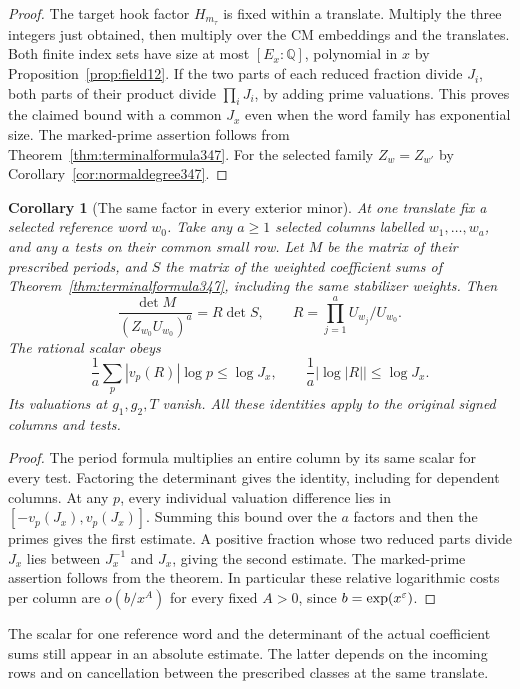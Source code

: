 \documentclass[a4paper,11pt]{article}
\newtheorem{corollary}[proposition]{Corollary}
\theoremstyle{definition}
\theoremstyle{remark}
\numberwithin{equation}{section}
\begin{document}
\begin{proof}
The target hook factor \(H_{m_\tau}\) is fixed within a
translate. Multiply the three integers just obtained, then
multiply over the CM embeddings and the translates. Both finite
index sets have size at most \([E_x:\mathbb Q]\), polynomial
in \(x\) by Proposition~\ref{prop:field12}. If the two parts
of each reduced fraction divide \(J_i\), both parts of their
product divide \(\prod_iJ_i\), by adding prime valuations.
This proves the claimed bound with a common \(J_x\) even when
the word family has exponential size. The marked-prime
assertion follows from Theorem~\ref{thm:terminalformula347}.
For the selected family \(Z_w=Z_{w'}\) by
Corollary~\ref{cor:normaldegree347}.
\end{proof}

\begin{corollary}[The same factor in every exterior minor]\leavevmode
\label{cor:wordplaces348}
At one translate fix a selected reference word \(w_0\). Take
any \(a\ge1\) selected columns labelled \(w_1,\ldots,w_a\),
and any \(a\) tests on their common small row. Let \(M\) be the
matrix of their prescribed periods, and \(S\) the matrix of the
weighted coefficient sums of Theorem~\ref{thm:terminalformula347},
including the same stabilizer weights. Then
\[
  \frac{\det M}{(Z_{w_0}U_{w_0})^a}
     = R\det S, \qquad R=\prod_{j=1}^a U_{w_j}/U_{w_0}.
\]
The rational scalar obeys
\[
 \frac1a\sum_p |v_p(R)|\log p\le\log J_x,\qquad
 \frac1a|\log|R||\le\log J_x.
\]
Its valuations at \(g_1,g_2,T\) vanish. All these identities
apply to the original signed columns and tests.
\end{corollary}
\begin{proof}
The period formula multiplies an entire column by its same scalar
for every test. Factoring the determinant gives the identity,
including for dependent columns. At any \(p\), every individual
valuation difference lies in \([-v_p(J_x),v_p(J_x)]\).
Summing this bound over the \(a\) factors and then the primes
gives the first estimate. A positive fraction whose two reduced
parts divide \(J_x\) lies between \(J_x^{-1}\) and \(J_x\),
giving the second estimate. The marked-prime assertion follows
from the theorem. In particular these relative logarithmic costs
per column are \(o(b/x^A)\) for every fixed \(A>0\), since
\(b=\exp(x^\varepsilon)\).
\end{proof}
The scalar for one reference word and the determinant of the
actual coefficient sums still appear in an absolute estimate.
The latter depends on the incoming rows and on cancellation
between the prescribed classes at the same translate.
\end{document}
